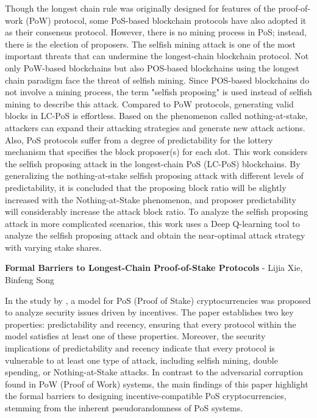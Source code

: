 Though the longest chain rule was originally designed for features of the proof-of-work (PoW) protocol, some PoS-based blockchain protocols have also adopted it as their consensus protocol. However, there is no mining process in PoS; instead, there is the election of proposers. The selfish mining attack is one of the most important threats that can undermine the longest-chain blockchain protocol. Not only PoW-based blockchains but also POS-based blockchains using the longest chain paradigm face the threat of selfish mining. Since POS-based blockchains do not involve a mining process, the term "selfish proposing" is used instead of selfish mining to describe this attack. Compared to PoW protocols, generating valid blocks in LC-PoS is effortless. Based on the phenomenon called nothing-at-stake, attackers can expand their attacking strategies and generate new attack actions. Also, PoS protocols suffer from a degree of predictability for the lottery mechanism that specifies the block proposer(s) for each slot. This work \cite{sarenche2024deep} considers the selfish proposing attack in the longest-chain PoS (LC-PoS) blockchains. By generalizing the nothing-at-stake selfish proposing attack with different levels of predictability, it is concluded that the proposing block ratio will be slightly increased with the Nothing-at-Stake phenomenon, and proposer predictability will considerably increase the attack block ratio. To analyze the selfish proposing attack in more complicated scenarios, this work uses a Deep Q-learning tool to analyze the selfish proposing attack and obtain the near-optimal attack strategy with varying stake shares.

\textbf{Formal Barriers to Longest-Chain Proof-of-Stake Protocols} - Lijia Xie, Binfeng Song

In the study by \cite{brown2019formal}, a model for PoS (Proof of Stake) cryptocurrencies was proposed to analyze security issues driven by incentives. The paper establishes two key properties: predictability and recency, ensuring that every protocol within the model satisfies at least one of these properties. Moreover, the security implications of predictability and recency indicate that every protocol is vulnerable to at least one type of attack, including selfish mining, double spending, or Nothing-at-Stake attacks. In contrast to the adversarial corruption found in PoW (Proof of Work) systems, the main findings of this paper highlight the formal barriers to designing incentive-compatible PoS cryptocurrencies, stemming from the inherent pseudorandomness of PoS systems.

